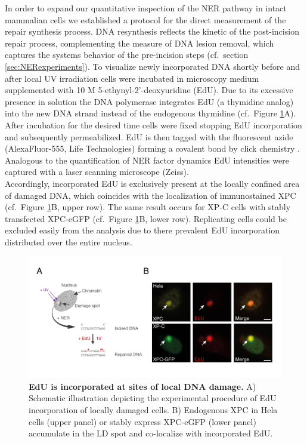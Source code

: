 In order to expand our quantitative inspection of the NER pathway in intact mammalian cells we established a protocol for the direct measurement of the repair synthesis process. DNA resynthesis reflects the kinetic of the post-incision repair process, complementing the measure of DNA lesion removal, which captures the systems behavior of the pre-incision steps (cf.\ section \ref{sec:NERexperiments}). To visualize newly incorporated DNA shortly before and after local UV irradiation cells were incubated in microscopy medium supplemented with 10 \textmu M 5-ethynyl-2'-deoxyuridine (EdU). Due to its excessive presence in solution the DNA polymerase integrates EdU (a thymidine analog) into the new DNA strand instead of the endogenous thymidine (cf.\ Figure \ref{fig:EdU_measurement}A). After incubation for the desired time cells were fixed stopping EdU incorporation and subsequently permeabilized. EdU is then tagged with the fluorescent azide (AlexaFluor-555, Life Technologies) forming a covalent bond by click chemistry \cite{Limsirichaikul2009}. Analogous to the quantification of NER factor dynamics EdU intensities were captured with a laser scanning microscope (Zeiss).\\
Accordingly, incorporated EdU is exclusively present at the locally confined area of  damaged DNA, which coincides with the localization of immunostained XPC (cf.\ Figure \ref{fig:EdU_measurement}B, upper row). The same result occurs for XP-C cells with stably transfected XPC-eGFP (cf.\ Figure \ref{fig:EdU_measurement}B, lower row). Replicating cells could be excluded easily from the analysis due to there prevalent EdU incorporation distributed over the entire nucleus. 
  

    
 


\begin{figure}[htbp]
\begin{center}
\includegraphics[width=1\textwidth]{Abbildungen/figure2_3.pdf}
\caption{\textbf{EdU is incorporated at sites of local DNA damage.} A) Schematic illustration depicting the experimental procedure of EdU incorporation of locally damaged cells. B) Endogenous XPC in Hela cells (upper panel) or stably express XPC-eGFP (lower panel) accumulate in the LD spot and co-localize with incorporated EdU.}
\label{fig:EdU_measurement}
\end{center}
\end{figure}


